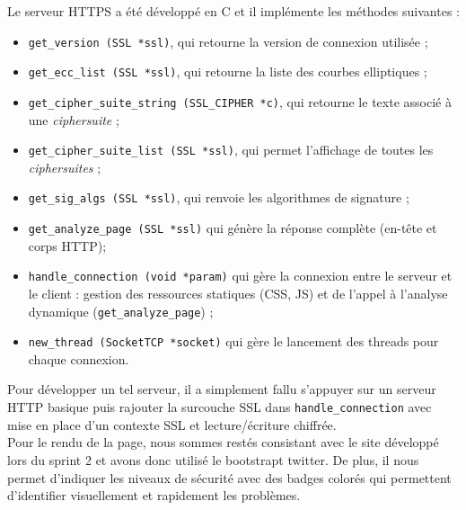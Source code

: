 Le serveur HTTPS a été développé en C et il implémente les méthodes suivantes :
\begin{itemize}
\item \verb+get_version (SSL *ssl)+, qui retourne la version de connexion utilisée ; 
\item \verb+get_ecc_list (SSL *ssl)+, qui retourne la liste des courbes elliptiques ; 
\item \verb+get_cipher_suite_string (SSL_CIPHER *c)+, qui retourne le texte associé à une \textit{ciphersuite} ; 
\item \verb+get_cipher_suite_list (SSL *ssl)+, qui permet l'affichage de toutes les \textit{ciphersuites} ; 
\item \verb+get_sig_algs (SSL *ssl)+, qui renvoie les algorithmes de signature ; 
\item \verb+get_analyze_page (SSL *ssl)+ qui génère la réponse complète (en-tête et corps HTTP);
\item \verb+handle_connection (void *param)+  qui gère la connexion entre le serveur et le client : gestion des ressources statiques (CSS, JS) et de l'appel à l'analyse dynamique (\verb+get_analyze_page+) ;
\item \verb+new_thread (SocketTCP *socket)+ qui gère le lancement des threads pour chaque connexion.\\
\end{itemize}

Pour développer un tel serveur, il a simplement fallu s'appuyer sur un serveur HTTP basique puis rajouter la surcouche SSL dans \verb+handle_connection+ avec mise en place d'un contexte SSL et lecture/écriture chiffrée.\\


Pour le rendu de la page, nous sommes restés consistant avec le site développé lors du sprint 2 et avons donc utilisé le bootstrapt twitter. De plus, il nous permet d'indiquer les niveaux de sécurité avec des badges colorés qui permettent d'identifier visuellement et rapidement les problèmes.
